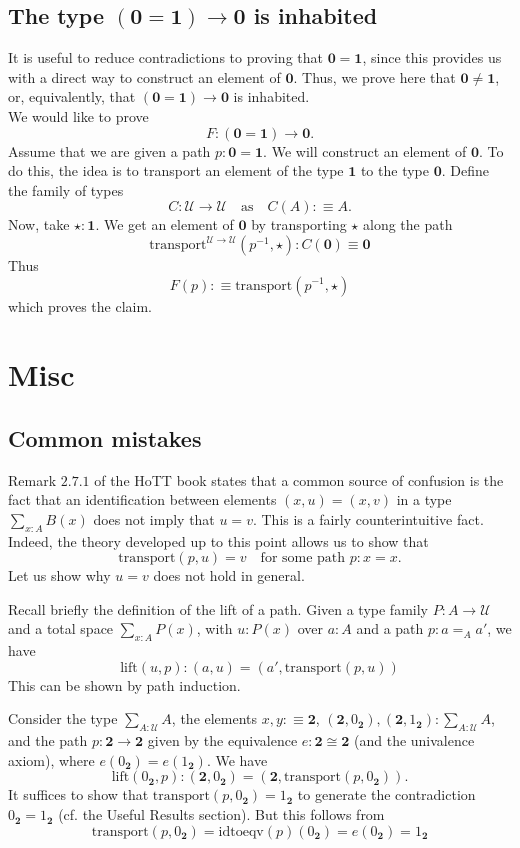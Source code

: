 \documentclass[14pt]{extarticle}
\newcommand{\0}{{\mathbf 0}}
\newcommand{\1}{{\mathbf 1}}
\newcommand{\2}{{\mathbf 2}}
\newcommand{\UU}{{\mathcal U}}
\newcommand{\tr}{\mathrm{transport}}
\newcommand{\idtoeqv}{\mathrm{idtoeqv}}
\newcommand{\lift}{\mathrm{lift}}
\newcommand{\quadt}[1]{\quad \text{#1} \quad}
\begin{document}
\subsection*{The type $(\0 = \1) \to \0$ is inhabited}
It is useful to reduce contradictions to proving that $\0 = \1$, since this provides us with a direct way to construct an element of $\0$. Thus, we prove here that $\0 \neq \1$, or, equivalently, that $(\0 = \1) \to \0$ is inhabited.\\
We would like to prove 
\[F : (\0 = \1) \to \0.\] Assume that we are given a path $p : \0 = \1$. We will construct an element of $\0$. To do this, the idea is to transport an element of the type $\1$ to the type $\0$. Define the family of types
\[C : \UU \to \UU \quadt{as} C(A) :\equiv A.\] Now, take $\star : \1$. We get an element of $\0$ by transporting $\star$ along the path
\[\tr^{\UU \to \UU}(p^{-1},\star) : C(\0) \equiv \0\] Thus 
\[F(p) :\equiv \tr(p^{-1},\star)\] which proves the claim.

\section*{Misc}
\subsection*{Common mistakes}
Remark $2.7.1$ of the HoTT book states that a common source of confusion is the fact that an identification between elements $(x,u) = (x,v)$ in a type $\sum_{x:A}B(x)$ does not imply that $u = v$. This is a fairly counterintuitive fact. Indeed, the theory developed up to this point allows us to show that
\[\tr(p,u) = v \quad \text{for some path } p:x=x.\] Let us show why $u=v$ does not hold in general.

Recall briefly the definition of the lift of a path. Given a type family $P : A \to \UU$ and a total space $\sum_{x:A}P(x)$, with $u : P(x)$ over $a : A$ and a path $p : a =_A a'$, we have
\[\lift(u,p) : (a,u) = (a',\tr(p,u))\] This can be shown by path induction.

Consider the type $\sum_{A:\UU}A$, the elements $x,y:\equiv \2$, $(\2,0_{\2}),(\2,1_{\2}):\sum_{A:\UU}A$, and the path $p : \2 \to \2$ given by the equivalence $e : \2 \cong \2$ (and the univalence axiom), where $e(0_\2) = e(1_\2)$. We have
\[\lift(0_{\2},p) : (\2,0_{\2}) = (\2,\tr(p,0_{\2})).\] It suffices to show that $\tr(p,0_{\2}) = 1_{\2}$ to generate the contradiction $0_{\2} = 1_{\2}$ (cf. the Useful Results section).
But this follows from
\[\tr(p,0_{\2}) = \idtoeqv(p)(0_{\2}) = e(0_{\2}) = 1_{\2}\]
\end{document}
